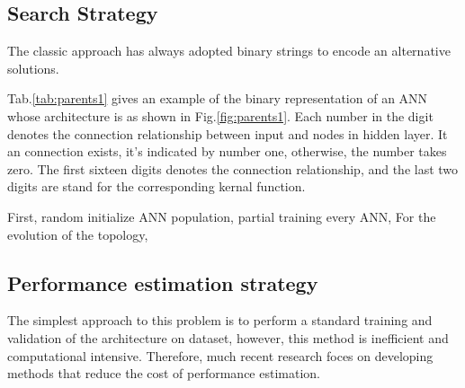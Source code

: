 \subsection{Search Strategy}

The classic approach has always adopted binary strings to encode an alternative solutions. 

Tab.\ref{tab:parents1}  gives an example of the binary representation of an ANN
whose architecture is as shown in Fig.\ref{fig:parents1}. Each number in the
digit denotes the connection relationship between input and nodes in hidden
layer. It an connection exists, it's indicated by number one, otherwise, the
number takes zero. The first sixteen digits denotes the connection relationship, and the
last two digits are stand for  the corresponding kernal function. 

First,  random initialize ANN population, partial training every ANN, 
For the evolution of the topology,

\subsection{Performance estimation strategy}
The simplest approach to this problem is to perform a standard training and
validation of the architecture on dataset, however, this method is inefficient
and computational intensive. Therefore, much recent
research\cite{baker2017accelerating} foces on developing methods that reduce
the cost of performance estimation.




